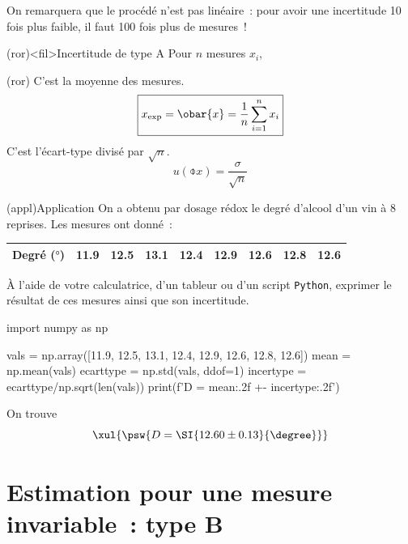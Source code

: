 \documentclass[../main/main.tex]{subfiles}
\begin{document}
On remarquera que le procédé n'est pas linéaire~: pour avoir une incertitude 10
fois plus faible, il faut 100 fois plus de mesures~!

\begin{tcb}(ror)<fil>{Incertitude de type A}
	Pour $n$ mesures $x_i$,
	\smallbreak
	\begin{isd}[cnt](ror)
		C'est la moyenne des mesures.
		\[
			\boxed{x_{\rm exp} = \obar{x} = \frac{1}{n} \sum_{i=1}^{n} x_i}
		\]
		\tcblower
		C'est l'écart-type divisé par $\sqrt{n}$.
		\[
			\boxed{u(\obar{x}) = \frac{\sigma}{\sqrt{n}}}
		\]
	\end{isd}
\end{tcb}

\begin{tcb}(appl){Application}
	On a obtenu par dosage rédox le degré d'alcool d'un vin à 8 reprises. Les
	mesures ont donné~:
	\begin{center}
		\begin{tabular}{lcccccccc}
			\toprule
			Degré ($\si{\degree}$) &
			\num{11.9}             &
			\num{12.5}             &
			\num{13.1}             &
			\num{12.4}             &
			\num{12.9}             &
			\num{12.6}             &
			\num{12.8}             &
			\num{12.6}
			\\
			\bottomrule
		\end{tabular}
	\end{center}
	À l'aide de votre calculatrice, d'un tableur ou d'un script \texttt{Python},
	exprimer le résultat de ces mesures ainsi que son incertitude.
	\tcblower
	\begin{python}
import numpy as np

vals = np.array([11.9, 12.5, 13.1, 12.4, 12.9, 12.6, 12.8, 12.6])
mean = np.mean(vals)
ecarttype = np.std(vals, ddof=1)
incertype = ecarttype/np.sqrt(len(vals))
print(f'D = {mean:.2f} +- {incertype:.2f}')
	\end{python}
	On trouve
	\[
		\xul{
			\psw{
				D = \SI{12.60 \pm  0.13}{\degree}
			}
		}
	\]
\end{tcb}

\section{Estimation pour une mesure invariable~: type B}
\end{document}
